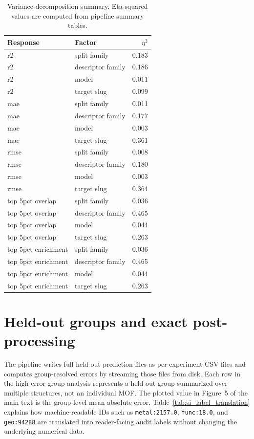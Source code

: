\documentclass[11pt,a4paper]{article}
\begin{document}
\begin{table}[H]
\centering
\caption{Variance-decomposition summary. Eta-squared values are computed from pipeline summary tables.}
\label{tab:si_variance}
\small
\begin{tabular}{llr}
\toprule
Response & Factor & $\eta^2$ \\
\midrule
r2 & split family & 0.183 \\
r2 & descriptor family & 0.186 \\
r2 & model & 0.011 \\
r2 & target slug & 0.099 \\
mae & split family & 0.011 \\
mae & descriptor family & 0.177 \\
mae & model & 0.003 \\
mae & target slug & 0.361 \\
rmse & split family & 0.008 \\
rmse & descriptor family & 0.180 \\
rmse & model & 0.003 \\
rmse & target slug & 0.364 \\
top 5pct overlap & split family & 0.036 \\
top 5pct overlap & descriptor family & 0.465 \\
top 5pct overlap & model & 0.044 \\
top 5pct overlap & target slug & 0.263 \\
top 5pct enrichment & split family & 0.036 \\
top 5pct enrichment & descriptor family & 0.465 \\
top 5pct enrichment & model & 0.044 \\
top 5pct enrichment & target slug & 0.263 \\
\bottomrule
\end{tabular}
\end{table}


\section{Held-out groups and exact post-processing}
The pipeline writes full held-out prediction files as per-experiment CSV files and computes group-resolved
errors by streaming those files from disk. Each row in the high-error-group analysis represents a held-out
group summarized over multiple structures, not an individual MOF. The plotted value in Figure~5 of the
main text is the group-level mean absolute error. Table~\ref{tab:si_label_translation} explains how
machine-readable IDs such as \texttt{metal:2157.0}, \texttt{func:18.0}, and \texttt{geo:94288} are translated
into reader-facing audit labels without changing the underlying numerical data.
\end{document}
